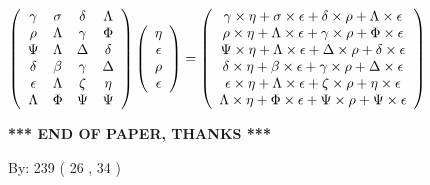 \documentclass[12pt]{article}
\begin{document}
$  %
 \left( \begin{array}
 {
 c
 c
 c
 c
 }
 \gamma & 
 \sigma & 
 \delta & 
 \Lambda \\ 
 \rho & 
 \Lambda & 
 \gamma & 
 \Phi \\ 
 \Psi & 
 \Lambda & 
 \Delta & 
 \delta \\ 
 \delta & 
 \beta & 
 \gamma & 
 \Delta \\ 
 \epsilon & 
 \Lambda & 
                    \zeta & 
 \eta \\ 
 \Lambda & 
 \Phi & 
 \Psi & 
 \Psi
 \end{array} \right)
 \left( \begin{array}
 {
 c
 }
 \eta \\ 
 \epsilon \\ 
 \rho \\ 
 \epsilon
 \end{array} \right)
=
 \left( \begin{array}
 {
 c
 }
  \gamma \times  \eta +  \sigma \times  \epsilon +  \delta \times  \rho +  \Lambda \times  \epsilon \\ 
  \rho \times  \eta +  \Lambda \times  \epsilon +  \gamma \times  \rho +  \Phi \times  \epsilon \\ 
  \Psi \times  \eta +  \Lambda \times  \epsilon +  \Delta \times  \rho +  \delta \times  \epsilon \\ 
  \delta \times  \eta +  \beta \times  \epsilon +  \gamma \times  \rho +  \Delta \times  \epsilon \\ 
  \epsilon \times  \eta +  \Lambda \times  \epsilon +                     \zeta \times  \rho +  \eta \times  \epsilon \\ 
  \Lambda \times  \eta +  \Phi \times  \epsilon +  \Psi \times  \rho +  \Psi \times  \epsilon
 \end{array} \right)
$
 
 
 
   
   
 \vspace{0.2in}
 
   
   
   
   
\vspace{1.0in} 
{\textbf{\large{ *** END OF PAPER, THANKS *** }}} 
   
   
\hspace{1.0in} By: 
         239 (          26 ,           34 )
   
   
   
   
\newpage 
\setcounter{page}{ 
    31001 } 
   
\end{document}
